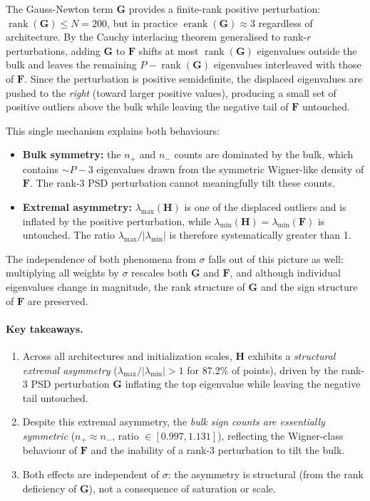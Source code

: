 \documentclass[12pt,a4paper]{article}
\newcommand{\rank}{\operatorname{rank}}
\newcommand{\erank}{\operatorname{erank}}
\newcommand{\bH}{\mathbf{H}}
\newcommand{\bG}{\mathbf{G}}
\newcommand{\bF}{\mathbf{F}}
\begin{document}
The Gauss-Newton term $\bG$ provides a finite-rank positive perturbation: $\rank(\bG) \leq N = 200$, but in practice $\erank(\bG) \approx 3$ regardless of architecture. By the Cauchy interlacing theorem generalised to rank-$r$ perturbations, adding $\bG$ to $\bF$ shifts at most $\rank(\bG)$ eigenvalues outside the bulk and leaves the remaining $P - \rank(\bG)$ eigenvalues interleaved with those of $\bF$. Since the perturbation is positive semidefinite, the displaced eigenvalues are pushed to the \emph{right} (toward larger positive values), producing a small set of positive outliers above the bulk while leaving the negative tail of $\bF$ untouched.

This single mechanism explains both behaviours:
\begin{itemize}
  \item \textbf{Bulk symmetry:} the $n_+$ and $n_-$ counts are dominated by the bulk, which contains $\sim P - 3$ eigenvalues drawn from the symmetric Wigner-like density of $\bF$. The rank-3 PSD perturbation cannot meaningfully tilt these counts.
  \item \textbf{Extremal asymmetry:} $\lambda_{\max}(\bH)$ is one of the displaced outliers and is inflated by the positive perturbation, while $\lambda_{\min}(\bH) = \lambda_{\min}(\bF)$ is untouched. The ratio $\lambda_{\max}/|\lambda_{\min}|$ is therefore systematically greater than 1.
\end{itemize}

The independence of both phenomena from $\sigma$ falls out of this picture as well: multiplying all weights by $\sigma$ rescales both $\bG$ and $\bF$, and although individual eigenvalues change in magnitude, the rank structure of $\bG$ and the sign structure of $\bF$ are preserved.

\paragraph{Key takeaways.}
\begin{enumerate}
  \item Across all architectures and initialization scales, $\bH$ exhibits a \emph{structural extremal asymmetry} ($\lambda_{\max}/|\lambda_{\min}| > 1$ for 87.2\% of points), driven by the rank-3 PSD perturbation $\bG$ inflating the top eigenvalue while leaving the negative tail untouched.
  \item Despite this extremal asymmetry, the \emph{bulk sign counts are essentially symmetric} ($n_+ \approx n_-$, ratio $\in [0.997, 1.131]$), reflecting the Wigner-class behaviour of $\bF$ and the inability of a rank-3 perturbation to tilt the bulk.
  \item Both effects are independent of $\sigma$: the asymmetry is structural (from the rank deficiency of $\bG$), not a consequence of saturation or scale.
\end{enumerate}
\end{document}
